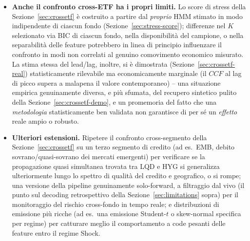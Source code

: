 \documentclass[11pt]{article}
\theoremstyle{definition}
\theoremstyle{remark}
\begin{document}
\begin{itemize}
    \item \textbf{Anche il confronto cross-ETF ha i propri limiti.} Lo score di stress della Sezione~\ref{sec:crossetf} \`e costruito a partire dal \emph{proprio} HMM stimato in modo indipendente di ciascun fondo (Sezione~\ref{sec:stress-score}); differenze nel $K$ selezionato via BIC di ciascun fondo, nella disponibilit\`a del campione, o nella separabilit\`a delle feature potrebbero in linea di principio influenzare il confronto in modi non correlati al genuino comovimento economico misurato. La stima stessa del lead/lag, inoltre, si \`e dimostrata (Sezione~\ref{sec:crossetf-real}) statisticamente rilevabile ma economicamente marginale (il $CCF$ al lag di picco supera a malapena il valore contemporaneo) -- una situazione empirica genuinamente diversa, e pi\`u sfumata, del recupero sintetico pulito della Sezione~\ref{sec:crossetf-demo}, e un promemoria del fatto che una \emph{metodologia} statisticamente ben validata non garantisce di per s\'e un \emph{effetto} reale ampio o robusto.
    \item \textbf{Ulteriori estensioni.} Ripetere il confronto cross-segmento della Sezione~\ref{sec:crossetf} su un terzo segmento di credito (ad es.\ EMB, debito sovrano/quasi-sovrano dei mercati emergenti) per verificare se la propagazione quasi simultanea trovata tra LQD e HYG si generalizza ulteriormente lungo lo spettro di qualit\`a del credito e geografico, o si rompe; una versione della pipeline genuinamente solo-forward, a filtraggio dal vivo (il punto sul decoding retrospettivo della Sezione~\ref{sec:limitations} sopra) per il monitoraggio del rischio cross-fondo in tempo reale; e distribuzioni di emissione pi\`u ricche (ad es.\ una emissione Student-$t$ o skew-normal specifica per regime) per catturare meglio il comportamento a code pesanti delle feature entro il regime Shock.
\end{itemize}
\end{document}
